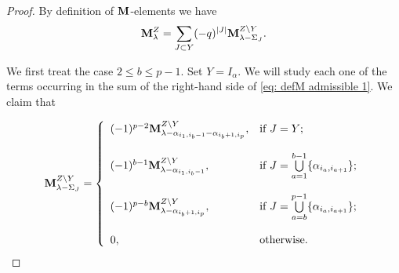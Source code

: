 \begin{proof}
By definition of $\mathbf{M}$-elements we have
 \begin{equation}\label{eq: defM admissible 1}
        \mathbf{M}_{\lambda}^{Z} = \sum_{J\subset Y} (-q)^{\mid J\mid } \mathbf{M}_{\lambda - \Sigma_{J}}^{Z\setminus Y} . 
    \end{equation}


We first treat the case  $2\leq b \leq p-1$. Set $Y = I_{\alpha}$.    
We will study each one of the terms occurring in  the sum of the right-hand side of \eqref{eq: defM admissible 1}. We claim that

\begin{equation}\label{eq: sum proof admisssible}
  \mathbf{M}_{\lambda - \Sigma_{J}}^{Z\setminus Y}  = \left\{ 
  \begin{array}{ll}
     (-1)^{p-2}\mathbf{M}_{\lambda - \alpha_{i_{1},i_{b}-1} -\alpha_{i_{b} +1 , i_{p}}}^{Z\setminus Y},   & \mbox{if }  J=Y; \\
       &   \\
    (-1)^{b-1}\mathbf{M}_{\lambda - \alpha_{i_{1},i_{b}-1}}^{Z\setminus Y},   & \mbox{if }  J = \bigcup\limits_{a=1}^{b-1} \{\alpha_{i_{a},i_{a+1}}\};  \\
    &  \\
    (-1)^{p-b}\mathbf{M}_{\lambda - \alpha_{i_{b}+1,i_{p}}}^{Z\setminus Y} , & \mbox{if } J = \bigcup\limits_{a=b}^{p-1} \{\alpha_{i_{a},i_{a+1}}\};\\
    & \\
    0,& \mbox{otherwise.}
  \end{array}
  \right.   
\end{equation}



    




\end{proof}
